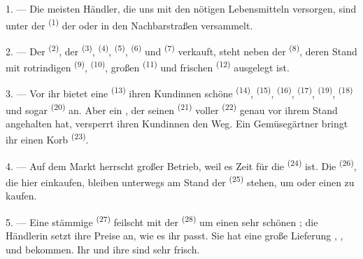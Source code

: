 \VUsaut{4.0mm}
\VUsaut{3.0mm}

\VUsaut{3.0mm}

1. --- Die meisten Händler, die uns mit den nötigen Lebensmitteln versorgen, sind
unter der  \textsuperscript{(1)} der  oder in den
Nachbarstraßen versammelt.

2. --- Der  \textsuperscript{(2)}, der 
\textsuperscript{(3)},  \textsuperscript{(4)}, 
\textsuperscript{(5)},  \textsuperscript{(6)} und
 \textsuperscript{(7)} verkauft, steht neben der
 \textsuperscript{(8)}, deren Stand mit
rotrindigen  \textsuperscript{(9)},
 \textsuperscript{(10)}, großen 
\textsuperscript{(11)} und frischen  \textsuperscript{(12)}
ausgelegt ist.

3. --- Vor ihr bietet eine  \textsuperscript{(13)} ihren
Kundinnen schöne  \textsuperscript{(14)}, 
\textsuperscript{(15)},  \textsuperscript{(16)}, 
\textsuperscript{(17)},  \textsuperscript{(19)}, 
\textsuperscript{(18)} und sogar  \textsuperscript{(20)} an. Aber ein
, der seinen  \textsuperscript{(21)}
voller  \textsuperscript{(22)} genau vor ihrem Stand angehalten
hat, versperrt ihren Kundinnen den Weg. Ein Gemüsegärtner bringt ihr einen Korb
 \textsuperscript{(23)}.

\VUsaut{4.0mm}
\VUsaut{3.0mm}

4. --- Auf dem Markt herrscht großer Betrieb, weil es Zeit für die
 \textsuperscript{(24)} ist. Die 
\textsuperscript{(26)}, die hier einkaufen, bleiben unterwegs am Stand der
 \textsuperscript{(25)} stehen, um  oder
einen  zu kaufen.

5. --- Eine stämmige  \textsuperscript{(27)} feilscht mit der
 \textsuperscript{(28)} um einen sehr schönen
; die Händlerin setzt ihre Preise an, wie es ihr passt. Sie hat
eine große Lieferung , ,  und
 bekommen. Ihr  und ihre  sind
sehr frisch.

